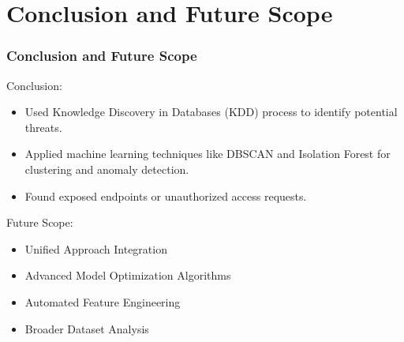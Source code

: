 \documentclass[10pt, a4paper]{beamer}
\begin{document}
	
	\section{Conclusion and Future Scope}
	\begin{frame}
		\frametitle{Conclusion and Future Scope}
		
		\begin{block}{Conclusion:}
			\begin{itemize}
				\item Used Knowledge Discovery in Databases (KDD) process to identify potential threats.
				\item Applied machine learning techniques like DBSCAN and Isolation Forest for clustering and anomaly detection.
				\item Found exposed endpoints or unauthorized access requests.
			\end{itemize}
		\end{block}
		
				\begin{block}{Future Scope:}
			\begin{itemize}
				\item Unified Approach Integration
				\item Advanced Model Optimization Algorithms
				\item Automated Feature Engineering	
				\item Broader Dataset Analysis			
			\end{itemize}
		\end{block}
	
	\end{frame}
	
	
	
	
	
	
	
\end{document}
